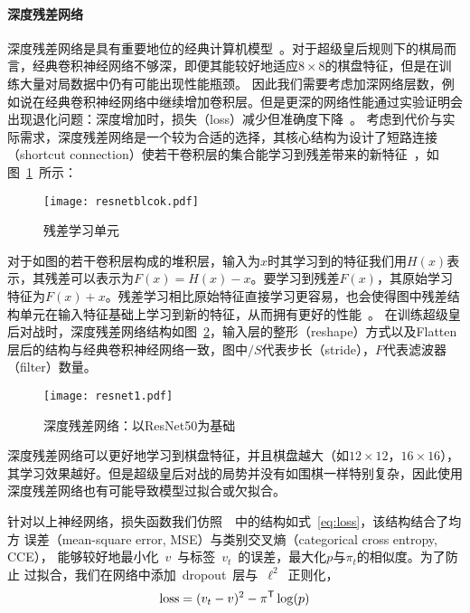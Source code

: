 \paragraph{深度残差网络}
深度残差网络是具有重要地位的经典计算机模型~\cite{resnet}。对于超级皇后规则下的棋局而言，经典卷积神经网络不够深，即便其能较好地适应$8\times8$的棋盘特征，但是在训练大量对局数据中仍有可能出现性能瓶颈。
因此我们需要考虑加深网络层数，例如说在经典卷积神经网络中继续增加卷积层。但是更深的网络性能通过实验证明会出现退化问题：深度增加时，损失（loss）减少但准确度下降~\cite{resnet,he2016identity}。
考虑到代价与实际需求，深度残差网络是一个较为合适的选择，其核心结构为设计了短路连接（shortcut connection）使若干卷积层的集合能学习到残差带来的新特征~\cite{resnet}，如图~\ref{fig:resunit}~所示：
\begin{figure}[H]
    \centering
    \texttt{[image: resnetblcok.pdf]}
    \caption[resunit]{%
    残差学习单元~\cite{resnet}%
      }
    \label{fig:resunit}
\end{figure}
对于如图的若干卷积层构成的堆积层，输入为$x$时其学习到的特征我们用$H(x)$表示，其残差可以表示为$F(x)=H(x)-x$。要学习到残差$F(x)$，其原始学习特征为$F(x)+x$。残差学习相比原始特征直接学习更容易，也会使得图中残差结构单元在输入特征基础上学习到新的特征，从而拥有更好的性能~\cite{he2016identity}。
在训练超级皇后对战时，深度残差网络结构如图~\ref{fig:res}，输入层的整形（reshape）方式以及Flatten层后的结构与经典卷积神经网络一致，图中$/S$代表步长（stride），$F$代表滤波器（filter）数量。
\begin{figure}[!t]
    \centering
    \texttt{[image: resnet1.pdf]}
    \caption[res]{%
    深度残差网络：以ResNet50为基础~\cite{resnet}%
      }
    \label{fig:res}
\end{figure}
深度残差网络可以更好地学习到棋盘特征，并且棋盘越大（如$12\times12$，$16\times16$），其学习效果越好。但是超级皇后对战的局势并没有如围棋一样特别复杂，因此使用深度残差网络也有可能导致模型过拟合或欠拟合。

针对以上神经网络，损失函数我们仿照~\cite{Silver2017}~中的结构如式~\eqref{eq:loss}，该结构结合了均方
误差（mean-square error, MSE）与类别交叉熵（categorical cross entropy, CCE），
能够较好地最小化~$v$~与标签~$v_{t}$~的误差，最大化$p$与$\pi_{t}$的相似度。为了防止
过拟合，我们在网络中添加~dropout~层与~$\ell^2$~正则化，
\begin{equation}
    \text{loss} = (v_{t}-v)^{2} - \pi^{\mathsf T}\log(p)
    \label{eq:loss}
\end{equation}

